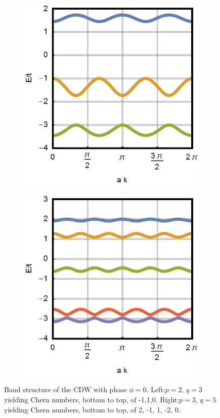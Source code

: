 \documentclass[letterpaper, 10 pt, conference]{ieeeconf}  %
\begin{document}
\begin{figure}[tbph]
\label{fig:bandstructure}
\begin{subfigure}{.49\linewidth}
\centering
\includegraphics{bandstructure_p=2_q=3.png}
\label{fig:sub1}
\end{subfigure}
\begin{subfigure}{.49\linewidth}
\centering
\includegraphics{bandstructure_p=3_q=5.png}
\label{fig:sub2}
\end{subfigure}
\caption{Band structure of the CDW with phase $\phi = 0$.
Left:$p = 2$, $q = 3$ yielding Chern numbers, bottom to top, of -1,1,0.
Right:$p = 3$, $q = 5$ yielding Chern numbers, bottom to top, of 2, -1, 1, -2, 0. }
\end{figure}
\end{document}
